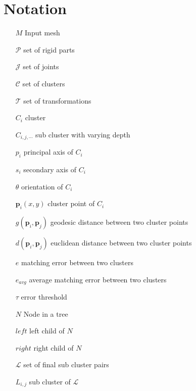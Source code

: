 \chapter{Notation}
\label{cha:Notation}

\begin{itemize}
	\item[$M$] Input mesh
	\item[$\mathcal{P}$] set of rigid parts
	\item[$\mathcal{J}$] set of joints
	\item[$\mathcal{C}$] set of clusters
	\item[$\mathcal{T}$] set of transformations
	\item[$C_i$] cluster
	\item[$C_{i,j,\cdots}$] sub cluster with varying depth
	\item[$p_i$] principal axis of $C_i$
	\item[$s_i$] secondary axis of $C_i$
	\item[$\theta$] orientation of $C_i$
	\item[$\boldsymbol{p}_i(x,y)$] cluster point of $C_i$
	\item[$g(\boldsymbol{p}_i,\boldsymbol{p}_j)$] geodesic distance between two cluster points
	\item[$d(\boldsymbol{p}_i,\boldsymbol{p}_j)$] euclidean distance between two cluster points
	\item[$e$] matching error between two clusters
	\item[$e_{avg}$] average matching error between two clusters 
	\item[$\tau$] error threshold 
	\item[$N$] Node in a tree
	\item[$\mathit{left}$] left child of $N$
	\item[$\mathit{right}$] right child of $N$
	\item[$\mathcal{L}$] set of final sub cluster pairs
	\item[$L_{i,j}$] sub cluster of $\mathcal{L}$	
\end{itemize}


